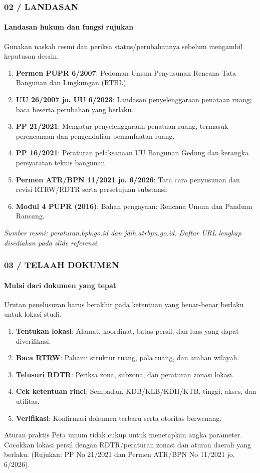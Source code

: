 \documentclass[../main.tex]{subfiles}
\begin{document}
\begin{frame}[mytitle=standard,t]
	\frametitle{02 / LANDASAN}
	\framesubtitle{Landasan hukum dan fungsi rujukan}

	Gunakan naskah resmi dan periksa status/perubahannya sebelum mengambil keputusan desain.

	\begin{enumerate}
		\item \textbf{Permen PUPR 6/2007}: Pedoman Umum Penyusunan Rencana Tata Bangunan dan Lingkungan (RTBL).
		\item \textbf{UU 26/2007 jo. UU 6/2023}: Landasan penyelenggaraan penataan ruang; baca beserta perubahan yang berlaku.
		\item \textbf{PP 21/2021}: Mengatur penyelenggaraan penataan ruang, termasuk perencanaan dan pengendalian pemanfaatan ruang.
		\item \textbf{PP 16/2021}: Peraturan pelaksanaan UU Bangunan Gedung dan kerangka persyaratan teknis bangunan.
		\item \textbf{Permen ATR/BPN 11/2021 jo. 6/2026}: Tata cara penyusunan dan revisi RTRW/RDTR serta persetujuan substansi.
		\item \textbf{Modul 4 PUPR (2016)}: Bahan pengayaan: Rencana Umum dan Panduan Rancang.
	\end{enumerate}

	\vfill
	\footnotesize\textit{Sumber resmi: peraturan.bpk.go.id dan jdih.atrbpn.go.id. Daftar URL lengkap disediakan pada slide referensi.}
\end{frame}

\begin{frame}[mytitle=standard,t,mycolor=digiPH_gray!10]
	\frametitle{03 / TELAAH DOKUMEN}
	\framesubtitle{Mulai dari dokumen yang tepat}

	Urutan penelusuran harus berakhir pada ketentuan yang benar-benar berlaku untuk lokasi studi.

	\begin{enumerate}
		\item \textbf{Tentukan lokasi}: Alamat, koordinat, batas persil, dan luas yang dapat diverifikasi.
		\item \textbf{Baca RTRW}: Pahami struktur ruang, pola ruang, dan arahan wilayah.
		\item \textbf{Telusuri RDTR}: Periksa zona, subzona, dan peraturan zonasi lokasi.
		\item \textbf{Cek ketentuan rinci}: Sempadan, KDB/KLB/KDH/KTB, tinggi, akses, dan utilitas.
		\item \textbf{Verifikasi}: Konfirmasi dokumen terbaru serta otoritas berwenang.
	\end{enumerate}

	\begin{block}{Aturan praktis}
		Peta umum tidak cukup untuk menetapkan angka parameter. Cocokkan lokasi persil dengan RDTR/peraturan zonasi dan aturan daerah yang berlaku. (Rujukan: PP No 21/2021 dan Permen ATR/BPN No 11/2021 jo. 6/2026).
	\end{block}
\end{frame}
\end{document}
